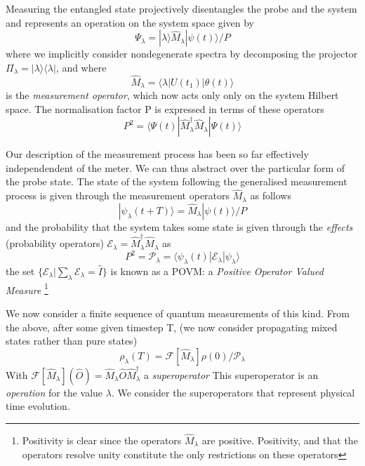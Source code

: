 Measuring the entangled state projectively disentangles the probe and the system and represents an operation on the system space given by
\begin{equation}
\Psi_\lambda = | \lambda \rangle \hat{M}_\lambda | \psi(t) \rangle / P
\end{equation}
 where we implicitly consider nondegenerate spectra by decomposing the projector $\Pi_\lambda = |\lambda \rangle \langle \lambda |$, and where
 \begin{equation}
     \hat{M}_\lambda = \langle \lambda | U(t_1) | \theta(t) \rangle
 \end{equation}
 is the \emph{measurement operator}, which now acts only only on the system Hilbert space. The normalisation factor P is expressed in terms of these operators
 \begin{equation}
     P^2 = \langle \Psi (t) | \hat{M}_\lambda^\dagger \hat{M}_\lambda | \Psi (t) \rangle
 \end{equation}

 Our description of the measurement process has been so far effectively independendent of the meter. We can thus abstract over the particular form of the probe state. The state of the system following the generalised measurement process is given through the measurement operators $\hat{M}_\lambda$ as follows
 \begin{equation}
 | \psi_\lambda (t + T) \rangle = \hat{M}_\lambda | \psi(t) \rangle /P
 \end{equation}
 and the probability that the system takes some state is given through the \emph{effects} (probability operators) $ \mathscr{E}_\lambda = \hat{M}_\lambda^\dagger \hat{M}_\lambda $ as
 \begin{equation}
     P^2 = \mathscr{P}_\lambda = \langle \psi_\lambda (t) | \mathscr{E}_\lambda | \psi_\lambda \rangle
 \end{equation}
 the set $\{\mathscr{E}_\lambda | \sum_\lambda \mathscr{E}_\lambda = \hat{I} \} $ is known as a POVM: a \emph{Positive Operator Valued Measure} \footnote{Positivity is clear since the operators $\hat{M}_\lambda$ are positive. Positivity, and that the operators resolve unity constitute the only restrictions on these operators}

 We now consider a finite sequence of quantum measurements of this kind. From the above, after some given timestep T, (we now consider propagating mixed states rather than pure states)
 \begin{equation}
     \rho_\lambda (T) = \mathscr{F}[\hat{M}_\lambda] \rho(0) / \mathscr{P}_\lambda
 \end{equation}
 With $\mathscr{F}[\hat{M}_\lambda] ( \hat{O} ) =  \hat{M}_\lambda \hat{O} \hat{M}_\lambda ^ \dagger$ a \emph{superoperator}
 This superoperator is an \emph{operation} for the value $\lambda$. We consider the superoperators that represent physical time evolution.
